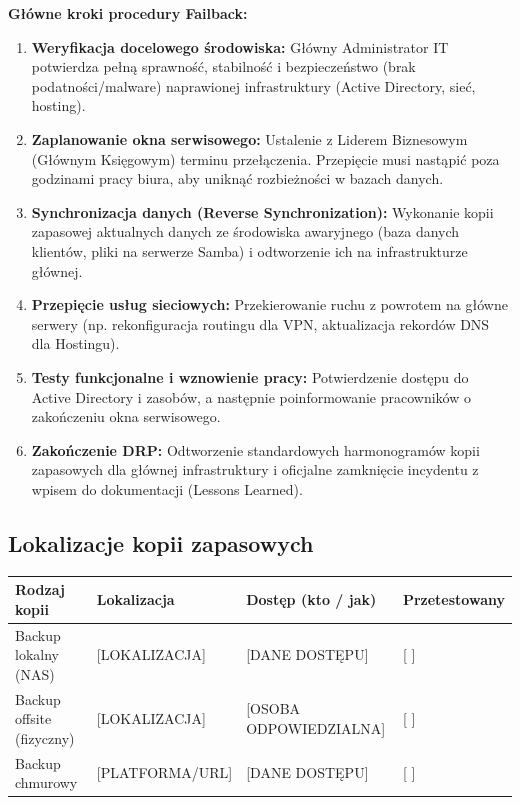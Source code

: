 \documentclass[12pt,a4paper]{article}
\providecommand{\tightlist}{\setlength{\itemsep}{0pt}\setlength{\parskip}{0pt}}
\begin{document}
\newpage
\textbf{Główne kroki procedury Failback:}
\begin{enumerate}
\tightlist
\item
  \textbf{Weryfikacja docelowego środowiska:} Główny Administrator IT potwierdza pełną sprawność, stabilność i bezpieczeństwo (brak podatności/malware) naprawionej infrastruktury (Active Directory, sieć, hosting).
\item
  \textbf{Zaplanowanie okna serwisowego:} Ustalenie z Liderem Biznesowym (Głównym Księgowym) terminu przełączenia. Przepięcie musi nastąpić poza godzinami pracy biura, aby uniknąć rozbieżności w bazach danych.
\item
  \textbf{Synchronizacja danych (Reverse Synchronization):} Wykonanie kopii zapasowej aktualnych danych ze środowiska awaryjnego (baza danych klientów, pliki na serwerze Samba) i odtworzenie ich na infrastrukturze głównej.
\item
  \textbf{Przepięcie usług sieciowych:} Przekierowanie ruchu z powrotem na główne serwery (np. rekonfiguracja routingu dla VPN, aktualizacja rekordów DNS dla Hostingu).
\item
  \textbf{Testy funkcjonalne i wznowienie pracy:} Potwierdzenie dostępu do Active Directory i zasobów, a następnie poinformowanie pracowników o zakończeniu okna serwisowego.
\item
  \textbf{Zakończenie DRP:} Odtworzenie standardowych harmonogramów kopii zapasowych dla głównej infrastruktury i oficjalne zamknięcie incydentu z wpisem do dokumentacji (Lessons Learned).
\end{enumerate}



\subsection{Lokalizacje kopii zapasowych}\label{lokalizacje-kopii-zapasowych}

\begin{longtable}[]{@{}>{\raggedright\arraybackslash}p{}>{\raggedright\arraybackslash}p{}>{\raggedright\arraybackslash}p{}>{\raggedright\arraybackslash}p{}@{}}
\toprule\noalign{}
Rodzaj kopii & Lokalizacja & Dostęp (kto / jak) & Przetestowany \\
\midrule\noalign{}
\endhead
\bottomrule\noalign{}
\endlastfoot
Backup lokalny (NAS) & {[}LOKALIZACJA{]} & {[}DANE DOSTĘPU{]} & {[} {]}
\underline{\hspace{2cm}} \\
Backup offsite (fizyczny) & {[}LOKALIZACJA{]} & {[}OSOBA
ODPOWIEDZIALNA{]} & {[} {]} \underline{\hspace{2cm}} \\
Backup chmurowy & {[}PLATFORMA/URL{]} & {[}DANE DOSTĘPU{]} & {[} {]}
\underline{\hspace{2cm}} \\
\end{longtable}
\end{document}
